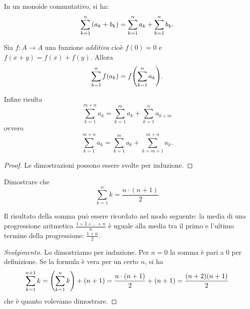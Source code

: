 \begin{theorem}
In un monoide commutativo, si ha:
  \[
  \sum_{k=1}^n  {\left( a_k + b_k \right)} 
  = \sum_{k=1}^n a_k + \sum_{k=1}^n b_k.
  \]

Sia $f\colon A\to A$ una funzione \emph{additiva}
cioè $f(0) = 0$ e $f(x+y)=f(x)+f(y)$.
Allora 
  \[
    \sum_{k=1}^n  f(a_k) = f{\left( \sum_{k=1}^n a_k \right)}.
  \]

Infine risulta 
  \[
  \sum_{k=1}^{m+n} a_k = \sum_{k=1}^m a_k + \sum_{k=1}^n a_{k+m}
  \]
ovvero 
  \[
  \sum_{k=1}^{m+n} a_k = \sum_{k=1}^m a_k + \sum_{k=m+1}^{m+n} a_k.  
  \]
\end{theorem}
\begin{proof}
  Le dimostrazioni possono essere svolte 
  per induzione.
\end{proof}

\begin{exercise}
  \label{ex:somma_lineare}%
  Dimostrare che 
  \[
    \sum_{k=1}^n k = \frac{n\cdot (n+1)}{2}
  \]
\end{exercise}
Il risultato della somma può essere ricordato nel modo seguente:
la media di una progressione aritmetica $\frac{1+2+ \dots + n}{n}$ 
è uguale alla media tra il primo 
e l'ultimo termine della progressione: $\frac{1+n}{2}$.
\begin{proof}[Svolgimento]
Lo dimostriamo per induzione.
Per $n=0$ la somma è pari a $0$ per definizione.
Se la formula è vera per un certo $n$, si ha 
\[
  \sum_{k=1}^{n+1} k = {\left( \sum_{k=1}^n k \right)} + (n+1)
   = \frac{n\cdot(n+1)}{2} + (n+1) 
   = \frac{(n+2)(n+1)}{2}
\]
che è quanto volevamo dimostrare.
\end{proof}

